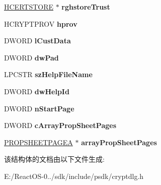 \begin{DoxyCompactItemize}
\hyperlink{interfacevoid}{H\+C\+E\+R\+T\+S\+T\+O\+RE} $\ast$ {\bfseries rghstore\+Trust}
\item 
\mbox{\label{structtag_c_e_r_t___v_i_e_w_p_r_o_p_e_r_t_i_e_s___s_t_r_u_c_t___a_ac1fd1f4f04ea55dde28c96c01916a79a}} 
H\+C\+R\+Y\+P\+T\+P\+R\+OV {\bfseries hprov}
\item 
\mbox{\label{structtag_c_e_r_t___v_i_e_w_p_r_o_p_e_r_t_i_e_s___s_t_r_u_c_t___a_af0a26ba77d4bd6a206cf1b06cb0af32e}} 
D\+W\+O\+RD {\bfseries l\+Cust\+Data}
\item 
\mbox{\label{structtag_c_e_r_t___v_i_e_w_p_r_o_p_e_r_t_i_e_s___s_t_r_u_c_t___a_acb5ee2ee7bb0aa65c312fbb6c461017b}} 
D\+W\+O\+RD {\bfseries dw\+Pad}
\item 
\mbox{\label{structtag_c_e_r_t___v_i_e_w_p_r_o_p_e_r_t_i_e_s___s_t_r_u_c_t___a_a7b36ae23795058a06ba5fa4b5b4fb3b0}} 
L\+P\+C\+S\+TR {\bfseries sz\+Help\+File\+Name}
\item 
\mbox{\label{structtag_c_e_r_t___v_i_e_w_p_r_o_p_e_r_t_i_e_s___s_t_r_u_c_t___a_a1e21f297378f8e5b446739b865ed225c}} 
D\+W\+O\+RD {\bfseries dw\+Help\+Id}
\item 
\mbox{\label{structtag_c_e_r_t___v_i_e_w_p_r_o_p_e_r_t_i_e_s___s_t_r_u_c_t___a_a841b559343dfd20506e492f4f614b6ca}} 
D\+W\+O\+RD {\bfseries n\+Start\+Page}
\item 
\mbox{\label{structtag_c_e_r_t___v_i_e_w_p_r_o_p_e_r_t_i_e_s___s_t_r_u_c_t___a_ab6506e0837c10d50d70750032f101408}} 
D\+W\+O\+RD {\bfseries c\+Array\+Prop\+Sheet\+Pages}
\item 
\mbox{\label{structtag_c_e_r_t___v_i_e_w_p_r_o_p_e_r_t_i_e_s___s_t_r_u_c_t___a_a7caeb54f7ea07a3f55f766cc72ce10ac}} 
\hyperlink{struct___p_r_o_p_s_h_e_e_t_p_a_g_e_a}{P\+R\+O\+P\+S\+H\+E\+E\+T\+P\+A\+G\+EA} $\ast$ {\bfseries array\+Prop\+Sheet\+Pages}
\end{DoxyCompactItemize}


该结构体的文档由以下文件生成\+:\begin{DoxyCompactItemize}
\item 
E\+:/\+React\+O\+S-\/0../sdk/include/psdk/cryptdlg.\+h\end{DoxyCompactItemize}
